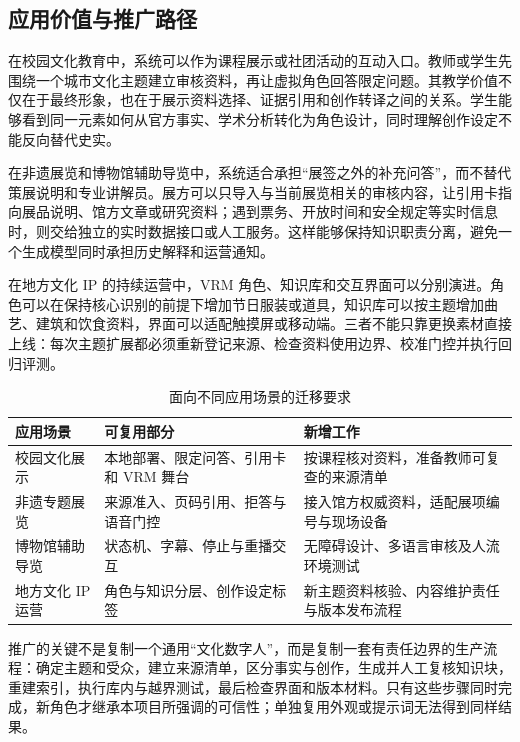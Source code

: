 \documentclass[UTF8,zihao=-4,fontset=none,twoside]{ctexart}
\begin{document}
\subsection{应用价值与推广路径}

在校园文化教育中，系统可以作为课程展示或社团活动的互动入口。教师或学生先围绕一个城市文化主题建立审核资料，再让虚拟角色回答限定问题。其教学价值不仅在于最终形象，也在于展示资料选择、证据引用和创作转译之间的关系。学生能够看到同一元素如何从官方事实、学术分析转化为角色设计，同时理解创作设定不能反向替代史实。

在非遗展览和博物馆辅助导览中，系统适合承担“展签之外的补充问答”，而不替代策展说明和专业讲解员。展方可以只导入与当前展览相关的审核内容，让引用卡指向展品说明、馆方文章或研究资料；遇到票务、开放时间和安全规定等实时信息时，则交给独立的实时数据接口或人工服务。这样能够保持知识职责分离，避免一个生成模型同时承担历史解释和运营通知。

在地方文化 IP 的持续运营中，VRM 角色、知识库和交互界面可以分别演进。角色可以在保持核心识别的前提下增加节日服装或道具，知识库可以按主题增加曲艺、建筑和饮食资料，界面可以适配触摸屏或移动端。三者不能只靠更换素材直接上线：每次主题扩展都必须重新登记来源、检查资料使用边界、校准门控并执行回归评测。

\begin{table}[htbp]
\centering
\caption{面向不同应用场景的迁移要求}
\label{tab:application-paths}
\small
\begin{tabularx}{\linewidth}{@{}P{28mm}Y Y@{}}
\toprule
应用场景 & 可复用部分 & 新增工作 \\
\midrule
校园文化展示 & 本地部署、限定问答、引用卡和 VRM 舞台 & 按课程核对资料，准备教师可复查的来源清单 \\
非遗专题展览 & 来源准入、页码引用、拒答与语音门控 & 接入馆方权威资料，适配展项编号与现场设备 \\
博物馆辅助导览 & 状态机、字幕、停止与重播交互 & 无障碍设计、多语言审核及人流环境测试 \\
地方文化 IP 运营 & 角色与知识分层、创作设定标签 & 新主题资料核验、内容维护责任与版本发布流程 \\
\bottomrule
\end{tabularx}
\end{table}

推广的关键不是复制一个通用“文化数字人”，而是复制一套有责任边界的生产流程：确定主题和受众，建立来源清单，区分事实与创作，生成并人工复核知识块，重建索引，执行库内与越界测试，最后检查界面和版本材料。只有这些步骤同时完成，新角色才继承本项目所强调的可信性；单独复用外观或提示词无法得到同样结果。
\end{document}
